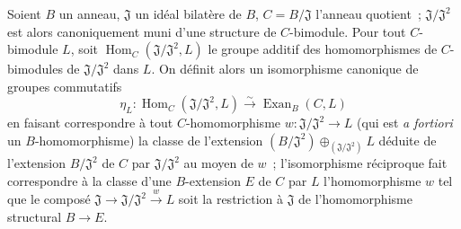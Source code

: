\begin{proposition}[18.3.8]
\label{0.18.3.8-fr}
Soient $B$ un anneau, $\mathfrak J$ un idéal bilatère de $B$,
$C=B/\mathfrak J$ l'anneau quotient~; $\mathfrak J/\mathfrak J^2$ est alors
canoniquement muni d'une structure de $C$-bimodule. Pour tout $C$-bimodule
$L$, soit $\operatorname{Hom}_C(\mathfrak J/\mathfrak J^2,L)$ le groupe
additif des homomorphismes de $C$-bimodules de $\mathfrak J/\mathfrak J^2$
dans $L$. On définit alors un isomorphisme canonique de groupes commutatifs
\begin{equation}
\label{0.18.3.8.1-fr}
\tag{18.3.8.1}
  \eta_L:\operatorname{Hom}_C(\mathfrak J/\mathfrak J^2,L)
  \xrightarrow{\sim}\operatorname{Exan}_B(C,L)
\end{equation}
en faisant correspondre à tout $C$-homomorphisme
$w:\mathfrak J/\mathfrak J^2\to L$ (qui est \emph{a fortiori} un
$B$-homomorphisme) la classe de l'extension
$(B/\mathfrak J^2)\oplus_{(\mathfrak J/\mathfrak J^2)}L$ déduite de
l'extension $B/\mathfrak J^2$ de $C$ par $\mathfrak J/\mathfrak J^2$ au moyen
de $w$~; l'isomorphisme réciproque fait correspondre à la classe d'une
$B$-extension $E$ de $C$ par $L$ l'homomorphisme $w$ tel que le composé
$\mathfrak J\to\mathfrak J/\mathfrak J^2\xrightarrow{w}L$ soit la restriction
à $\mathfrak J$ de l'homomorphisme structural $B\to E$.
\end{proposition}

